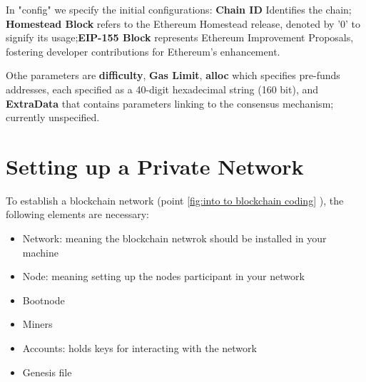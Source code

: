In "config" we specify the initial configurations: \textbf{Chain ID} Identifies the chain; \textbf{Homestead Block} refers to the Ethereum Homestead release, denoted by '0' to signify its usage;\textbf{EIP-155 Block} represents Ethereum Improvement Proposals, fostering developer contributions for Ethereum's enhancement.

Othe parameters are \textbf{difficulty}, \textbf{Gas Limit}, \textbf{alloc} which specifies pre-funds addresses, each specified as a 40-digit hexadecimal string (160 bit), and \textbf{ExtraData} that contains parameters linking to the consensus mechanism; currently unspecified.


\section{Setting up a Private Network}

To establish a blockchain network (point \ref{fig:into to blockchain coding} ), the following elements are necessary:

\begin{itemize}
    \item Network: meaning the blockchain netwrok should be installed in your machine
    \item Node: meaning setting up the nodes participant in your network
    \item Bootnode
    \item Miners
    \item Accounts: holds keys for interacting with the network
    \item Genesis file
\end{itemize}




